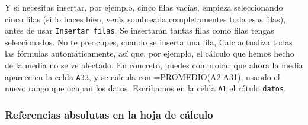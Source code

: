 \documentclass[10pt,a4paper]{article}\usepackage[]{graphicx}\usepackage[]{color}
\begin{document}
Y si necesitas insertar, por ejemplo, cinco filas vacías, empieza seleccionando cinco filas (si lo haces bien, verás sombreada completamentes toda esas filas), antes de usar {\tt Insertar filas}. Se insertarán tantas filas como filas tengas seleccionados. No te preocupes, cuando se inserta una fila, Calc actualiza todas las fórmulas automáticamente, así que, por ejemplo, el cálculo que hemos hecho de la media no se ve afectado. En concreto, puedes comprobar que ahora la media aparece en la celda {\tt A33}, y se calcula con {=PROMEDIO(A2:A31), usando el nuevo rango que ocupan los datos}. Escribamos en la celda {\tt A1} el rótulo {{\tt datos}}.

\subsubsection*{Referencias absolutas en la hoja de cálculo}
\label{tut01:ReferenciasAbsolutasHojaCalculo}
\end{document}
